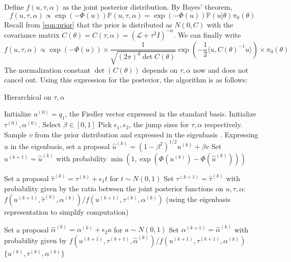 \documentclass{siamart1116}
\begin{document}
\begin{algorithm}
Define $f(u,\tau,\alpha)$ as the joint posterior distribution. By Bayes' theorem, 
\[f(u,\tau,\alpha) \propto \exp(-\Phi(u))\mathbb{P}(u,\tau,\alpha) = \exp(-\Phi(u))\mathbb{P}(u|\theta)\pi_0(\theta)\]
Recall from \cref{eqn:prior} that the prior is distributed as $N(0, C)$ with the covariance matrix $C(\theta) = C(\tau, \alpha) = (\mathcal{L} + \tau^2I)^{-\alpha}$. We can finally write
\[f(u,\tau,\alpha) \propto \exp(-\Phi(u))\times \frac{1}{\sqrt{(2\pi)^d \det C(\theta)}} \exp(-\frac{1}{2}\langle u, C(\theta)^{-1}u  \rangle) \times \pi_0(\theta)\]
The normalization constant $\det(C(\theta))$ depends on $\tau, \alpha$ now and does not cancel out. Using this expression for the posterior, the algorithm is as follows:

\caption{Hierarchical on $\tau, \alpha$}
\label{alg:hierarchical_tau_alpha}
\begin{algorithmic}
\State Initialize $u^{(0)} = q_1$, the Fiedler vector expressed in the standard basis.
\State Initialize $\tau^{(0)}, \alpha^{(0)}$. Select $\beta \in [0, 1]$
\State Pick $\epsilon_1, \epsilon_2$, the jump sizes for $\tau, \alpha$ respectively.
\State Sample $v$ from the prior distribution and expressed in the eigenbasis .
\State Expressing $u$ in the eigenbasis, set a proposal $\hat u^{(k)} = (1- \beta^2)^{1/2}u^{(k)} + \beta v$
\State Set $u^{(k+1)} = \hat u^{(k)}$ with probability $\min (1, \exp(\Phi(u^{(k)}) - \Phi(\hat u^{(k)})) )$

\State Set a proposal $\hat \tau^{(k)} = \tau^{(k)} + \epsilon_1 t$ for $t \sim N(0, 1)$ 
\State Set $\tau^{(k+1)} = \hat \tau^{(k)}$ with probability given by the ratio between the joint posterior functions on $u, \tau, \alpha$: $f(u^{(k+1)}, \hat \tau^{(k)}, \alpha^{(k)})/f(u^{(k+1)}, \tau^{(k)}, \alpha^{(k)})$ (using the eigenbasis representation to simplify computation)

\State Set a proposal $\hat \alpha^{(k)} = \alpha^{(k)} + \epsilon_2 a$ for $a \sim N(0, 1)$ 
\State Set $\alpha^{(k+1)} = \hat \alpha^{(k)}$ with probability given by $f(u^{(k+1)}, \tau^{(k+1)}, \hat \alpha^{(k)})/f(u^{(k+1)}, \tau^{(k+1)}, \alpha^{(k)})$
\EndFor\\
\Return $\{u^{(k)}, \tau^{(k)}, \alpha^{(k)}\}$
\end{algorithmic}
\end{algorithm}
\end{document}
